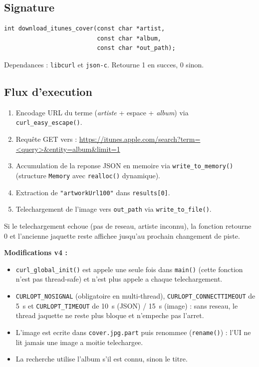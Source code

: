 \documentclass[a4paper,11pt]{article}
\begin{document}
\subsection{Signature}

\begin{lstlisting}[style=ccode]
int download_itunes_cover(const char *artist,
                          const char *album,
                          const char *out_path);
\end{lstlisting}

Dependances : \texttt{libcurl} et \texttt{json-c}. Retourne 1 en succes, 0 sinon.

\subsection{Flux d'execution}

\begin{enumerate}
  \item Encodage URL du terme (\textit{artiste} + espace + \textit{album}) via
    \texttt{curl\_easy\_escape()}.
  \item Requête GET vers :
    \url{https://itunes.apple.com/search?term=<query>&entity=album&limit=1}
  \item Accumulation de la reponse JSON en memoire via \texttt{write\_to\_memory()}
    (structure \texttt{Memory} avec \texttt{realloc()} dynamique).
  \item Extraction de \texttt{"artworkUrl100"} dans \texttt{results[0]}.
  \item Telechargement de l'image vers \texttt{out\_path} via
    \texttt{write\_to\_file()}.
\end{enumerate}

Si le telechargement echoue (pas de reseau, artiste inconnu), la fonction retourne 0
et l'ancienne jaquette reste affichee jusqu'au prochain changement de piste.

\textbf{Modifications v4 :}
\begin{itemize}
  \item \texttt{curl\_global\_init()} est appele une seule fois dans \texttt{main()} (cette
    fonction n'est pas thread-safe) et n'est plus appele a chaque telechargement.
  \item \texttt{CURLOPT\_NOSIGNAL} (obligatoire en multi-thread), \texttt{CURLOPT\_CONNECTTIMEOUT}
    de 5~s et \texttt{CURLOPT\_TIMEOUT} de 10~s (JSON) / 15~s (image) : sans reseau, le
    thread jaquette ne reste plus bloque et n'empeche pas l'arret.
  \item L'image est ecrite dans \texttt{cover.jpg.part} puis renommee (\texttt{rename()}) :
    l'UI ne lit jamais une image a moitie telechargee.
  \item La recherche utilise l'album s'il est connu, sinon le titre.
\end{itemize}
\end{document}

